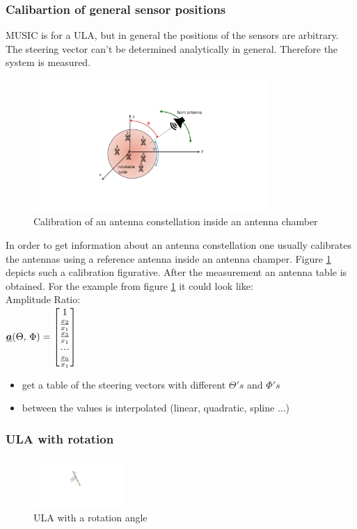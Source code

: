 \subsubsection{Calibartion of general sensor positions }
MUSIC is for a ULA, but in general the positions of the sensors are arbitrary. The steering vector can't be determined analytically in general. Therefore the system is measured. 
\begin{figure}[H]
	\centering
		\includegraphics[trim =5cm 3cm 5cm 3cm, clip, width=0.80\textwidth]{graphics/Calibration_scenario.pdf}
	\caption{Calibration of an antenna constellation inside an antenna chamber}
	\label{fig:Calibration_scenario}
\end{figure}

In order to get information about an antenna constellation one usually calibrates the antennas using a reference antenna inside an antenna champer. Figure \ref{fig:Calibration_scenario} depicts such a calibration figurative. After the measurement an antenna table is obtained. For the example from figure \ref{fig:Calibration_scenario} it could look like:\\
Amplitude Ratio:\\
$\underline{\boldsymbol {a}}(\Theta,\,\Phi)=\begin{bmatrix} 1\\\frac{x_2}{x_1}\\\frac{x_3}{x_1}\\\!\cdot \!\cdot\!\cdot\!\\\frac{x_6}{x_1} \end{bmatrix}$

\begin{itemize}
\item get a table of the steering vectors with different $\Theta's$ and $\Phi's$
\item between the values is interpolated (linear, quadratic, spline ...)
\end{itemize}

\subsubsection{ULA with rotation}
\begin{figure}[H]
	\centering
		\includegraphics[trim =14cm 8cm 15.5cm 4.7cm, clip, width=0.30\textwidth]{graphics/ULA_angle.pdf}
	\caption{ULA with a rotation angle}
	\label{fig:ULA_angle}
\end{figure}

